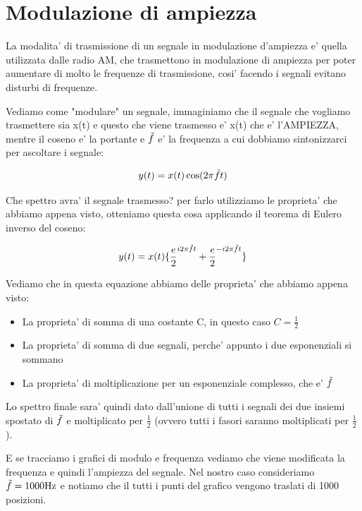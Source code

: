 \section{Modulazione di ampiezza}
La modalita' di trasmissione di un segnale in modulazione d'ampiezza e' quella utilizzata dalle radio AM, che trasmettono in modulazione di ampiezza per poter aumentare di molto le frequenze di trasmissione, cosi' facendo i segnali evitano disturbi di frequenze.

Vediamo come "modulare" un segnale, immaginiamo che il segnale che vogliamo trasmettere sia x(t) e questo che viene trasmesso e' x(t) che e' l'AMPIEZZA, mentre il coseno e' la portante e $\Tilde{f}$ e' la frequenza a cui dobbiamo sintonizzarci per ascoltare i segnale:

\begin{equation}
    y(t) = x(t) \cos (2\pi \Tilde{f} t)
\end{equation}

Che spettro avra' il segnale trasmesso? per farlo utilizziamo le proprieta' che abbiamo appena visto, otteniamo questa cosa applicando il teorema di Eulero inverso del coseno:

\begin{equation}
    y(t) = x(t) \{ \frac{e}{2}^{i 2 \pi \Tilde{f} t} + \frac{e}{2}^{-i 2 \pi \Tilde{f} t}  \}
\end{equation}

Vediamo che in questa equazione abbiamo delle proprieta' che abbiamo appena visto:
\begin{itemize}
    \item La proprieta' di somma di una costante C, in questo caso $C = \frac{1}{2}$
    \item La proprieta' di somma di due segnali, perche' appunto i due esponenziali si sommano
    \item La proprieta' di moltiplicazione per un esponenziale complesso, che e' $\Tilde{f}$ 
\end{itemize}

Lo spettro finale sara' quindi dato dall'unione di tutti i segnali dei due insiemi spostato di $\Tilde{f}$ e moltiplicato per $\frac{1}{2}$ (ovvero tutti i fasori saranno moltiplicati per $\frac{1}{2}$).

E se tracciamo i grafici di modulo e frequenza vediamo che viene modificata la frequenza e quindi l'ampiezza del segnale.
Nel nostro caso consideriamo $\Tilde{f} = 1000 \mbox{Hz}$ e notiamo che il tutti i punti del grafico vengono traslati di 1000 posizioni.


